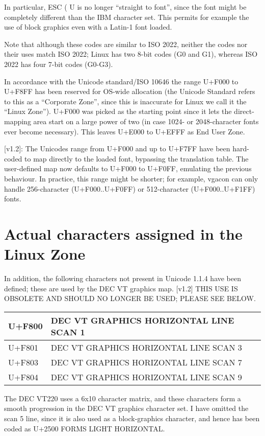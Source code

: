 \documentclass[a4paper,8pt,english]{sphinxmanual}
\begin{document}
In particular, ESC ( U is no longer ``straight to font'', since the font
might be completely different than the IBM character set.  This
permits for example the use of block graphics even with a Latin-1 font
loaded.

Note that although these codes are similar to ISO 2022, neither the
codes nor their uses match ISO 2022; Linux has two 8-bit codes (G0 and
G1), whereas ISO 2022 has four 7-bit codes (G0-G3).

In accordance with the Unicode standard/ISO 10646 the range U+F000 to
U+F8FF has been reserved for OS-wide allocation (the Unicode Standard
refers to this as a ``Corporate Zone'', since this is inaccurate for
Linux we call it the ``Linux Zone'').  U+F000 was picked as the starting
point since it lets the direct-mapping area start on a large power of
two (in case 1024- or 2048-character fonts ever become necessary).
This leaves U+E000 to U+EFFF as End User Zone.

{[}v1.2{]}: The Unicodes range from U+F000 and up to U+F7FF have been
hard-coded to map directly to the loaded font, bypassing the
translation table.  The user-defined map now defaults to U+F000 to
U+F0FF, emulating the previous behaviour.  In practice, this range
might be shorter; for example, vgacon can only handle 256-character
(U+F000..U+F0FF) or 512-character (U+F000..U+F1FF) fonts.


\section{Actual characters assigned in the Linux Zone}
\label{admin-guide/unicode:actual-characters-assigned-in-the-linux-zone}
In addition, the following characters not present in Unicode 1.1.4
have been defined; these are used by the DEC VT graphics map.  {[}v1.2{]}
THIS USE IS OBSOLETE AND SHOULD NO LONGER BE USED; PLEASE SEE BELOW.

\begin{tabulary}{\linewidth}{|L|L|}
\hline

U+F800
 & 
DEC VT GRAPHICS HORIZONTAL LINE SCAN 1
\\
\hline
U+F801
 & 
DEC VT GRAPHICS HORIZONTAL LINE SCAN 3
\\
\hline
U+F803
 & 
DEC VT GRAPHICS HORIZONTAL LINE SCAN 7
\\
\hline
U+F804
 & 
DEC VT GRAPHICS HORIZONTAL LINE SCAN 9
\\
\hline\end{tabulary}


The DEC VT220 uses a 6x10 character matrix, and these characters form
a smooth progression in the DEC VT graphics character set.  I have
omitted the scan 5 line, since it is also used as a block-graphics
character, and hence has been coded as U+2500 FORMS LIGHT HORIZONTAL.
\end{document}
